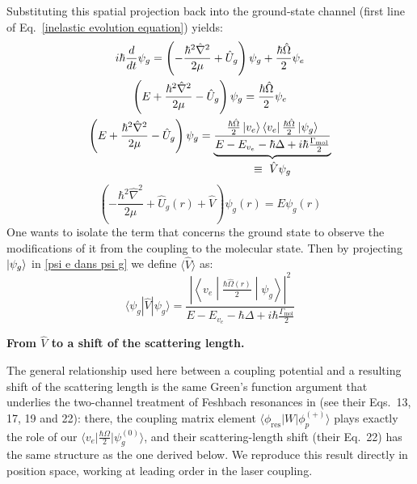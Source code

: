 Substituting this spatial projection back into the ground-state channel (first line of Eq.~\ref{inelastic evolution equation}) yields:
\begin{gather}
    i\hbar\frac{d}{dt}\psi_g = \left(-\frac{\hbar^2\hat{\nabla}^2}{2\mu}+\hat{U}_g\right)\psi_g +\frac{\hbar\hat{\Omega}}{2}\psi_e\\
    \left(E+\frac{\hbar^2\hat{\nabla}^2}{2\mu} - \hat{U}_g\right) \psi_g = \frac{\hbar\hat{\Omega}}{2} \psi_e\\
    \left(E+\frac{\hbar^2\hat{\nabla}^2}{2\mu} - \hat{U}_g\right) \psi_g =  \underbrace{\frac{\frac{\hbar\hat{\Omega}}{2}\ket{v_e}\bra{v_e}\frac{\hbar\hat{\Omega}}{2}\ket{\psi_g}}{E-E_{v_e} - \hbar\Delta + 
    i\hbar\frac{\Gamma_{\text{mol}}}{2}}}_{\displaystyle \equiv\ \hat{V}\psi_g}
\end{gather}
\begin{equation}
\left(-\frac{\hbar^2\hat{\nabla}^2}{2\mu} + \hat{U}_g(r) + \hat{V}\right)\psi_g(r) = E \psi_g(r)
\label{psi e dans psi g}
\end{equation}
One wants to isolate the term that concerns the ground state to observe the modifications of it from the coupling to the molecular state. Then by projecting $\ket{\psi_g}$ in \ref{psi e dans psi g} we define $\langle\hat{V}\rangle$ as:
\begin{equation}
\langle \psi_g | \hat{V} | \psi_g \rangle = \frac{\left| \left\langle v_e \middle| \frac{\hbar\hat{\Omega}(r)}{2} \middle| \psi_g \right\rangle \right|^2}{E - E_{v_e} - \hbar\Delta + 
i\hbar\frac{\Gamma_{\text{mol}}}{2}}
\label{V_opt}
\end{equation}

\textbf{From $\hat V$ to a shift of the scattering length.}

The general relationship used here between a coupling potential and a
resulting shift of the scattering length is the same Green's function
argument that underlies the two-channel treatment of Feshbach resonances in
\cite{goral_adiabatic_2004} (see their Eqs.~13, 17, 19 and 22): there, the
coupling matrix element $\langle\phi_{\text{res}}\vert W\vert\phi_p^{(+)}
\rangle$ plays exactly the role of our $\langle v_e\vert\frac{\hbar\Omega}{2}
\vert\psi_g^{(0)}\rangle$, and their scattering-length shift (their Eq.~22)
has the same structure as the one derived below. We reproduce this result
directly in position space, working at leading order in the laser coupling.

